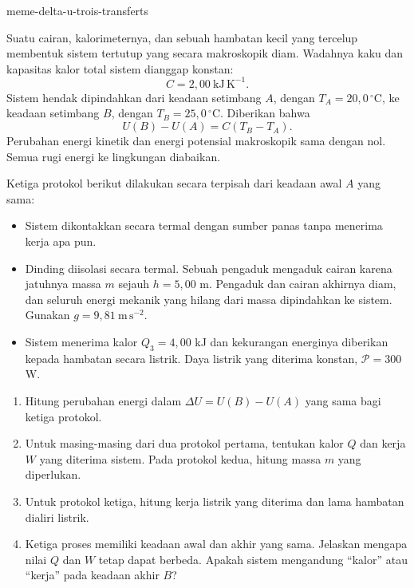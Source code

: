 \begin{exo}{meme-delta-u-trois-transferts}

Suatu cairan, kalorimeternya, dan sebuah hambatan kecil yang tercelup membentuk
sistem tertutup yang secara makroskopik diam. Wadahnya kaku dan kapasitas kalor
total sistem dianggap konstan:
\[
C=2{,}00\ \mathrm{kJ\,K^{-1}}.
\]
Sistem hendak dipindahkan dari keadaan setimbang $A$, dengan
$T_A=20{,}0\,^\circ\mathrm{C}$, ke keadaan setimbang $B$, dengan
$T_B=25{,}0\,^\circ\mathrm{C}$. Diberikan bahwa
\[
U(B)-U(A)=C(T_B-T_A).
\]
Perubahan energi kinetik dan energi potensial makroskopik sama dengan nol.
Semua rugi energi ke lingkungan diabaikan.

Ketiga protokol berikut dilakukan secara terpisah dari keadaan awal $A$ yang sama:
\begin{itemize}
\item[Protokol 1] Sistem dikontakkan secara termal dengan sumber panas tanpa menerima kerja apa pun.
\item[Protokol 2] Dinding diisolasi secara termal. Sebuah pengaduk mengaduk cairan karena jatuhnya massa $m$ sejauh $h=5{,}00$ m. Pengaduk dan cairan akhirnya diam, dan seluruh energi mekanik yang hilang dari massa dipindahkan ke sistem. Gunakan $g=9{,}81\ \mathrm{m\,s^{-2}}$.
\item[Protokol 3] Sistem menerima kalor $Q_3=4{,}00$ kJ dan kekurangan energinya diberikan kepada hambatan secara listrik. Daya listrik yang diterima konstan, $\mathcal P=300$ W.
\end{itemize}

\begin{enumerate}
\item Hitung perubahan energi dalam $\Delta U=U(B)-U(A)$ yang sama bagi ketiga protokol.
\item Untuk masing-masing dari dua protokol pertama, tentukan kalor $Q$ dan kerja $W$ yang diterima sistem. Pada protokol kedua, hitung massa $m$ yang diperlukan.
\item Untuk protokol ketiga, hitung kerja listrik yang diterima dan lama hambatan dialiri listrik.
\item Ketiga proses memiliki keadaan awal dan akhir yang sama. Jelaskan mengapa nilai $Q$ dan $W$ tetap dapat berbeda. Apakah sistem mengandung “kalor” atau “kerja” pada keadaan akhir $B$?
\end{enumerate}


\end{exo}
